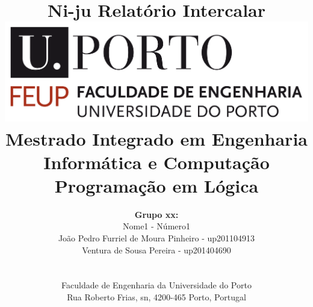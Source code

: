 \documentclass[a4paper]{article}
\begin{document}
\setlength{\textwidth}{16cm}
\setlength{\textheight}{22cm}

\title{\Huge\textbf{Ni-ju}\linebreak\linebreak\linebreak
\Large\textbf{Relatório Intercalar}\linebreak\linebreak
\linebreak\linebreak
\includegraphics[scale=0.1]{../printscreens/feup-logo.png}\linebreak\linebreak
\linebreak\linebreak
\Large{Mestrado Integrado em Engenharia Informática e Computação} \linebreak\linebreak
\Large{Programação em Lógica}\linebreak
}

\author{\textbf{Grupo xx:}\\
Nome1 - Número1 \\
João Pedro Furriel de Moura Pinheiro - up201104913\\
Ventura de Sousa Pereira - up201404690\\
\linebreak\linebreak \\
 \\ Faculdade de Engenharia da Universidade do Porto \\ Rua Roberto Frias, s\/n, 4200-465 Porto, Portugal \linebreak\linebreak\linebreak
\linebreak\linebreak\vspace{1cm}}

\maketitle
\thispagestyle{empty}
\end{document}
